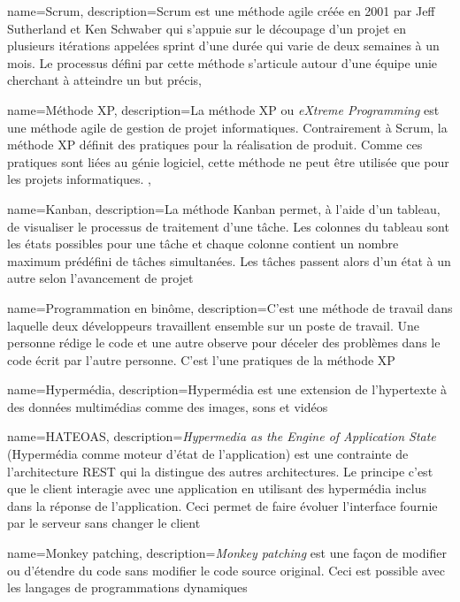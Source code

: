 \documentclass[a4paper,12pt,dvipsnames]{report}
\begin{document}
{
	name={Scrum},
	description={Scrum est une méthode agile créée en 2001 par Jeff Sutherland et Ken Schwaber qui s'appuie sur le découpage d'un projet en plusieurs itérations appelées sprint d'une durée qui varie de deux semaines à un mois. Le processus défini par cette méthode s'articule autour d'une équipe unie cherchant à atteindre un but précis},
}

{
	name={M\'ethode XP},
	description={La méthode XP ou \textit{eXtreme Programming} est une méthode agile de gestion de projet informatiques. Contrairement à Scrum, la méthode XP définit des pratiques pour la réalisation de produit. Comme ces pratiques sont liées au génie logiciel, cette méthode ne peut être utilisée que pour les projets informatiques. },
}

{
	name={Kanban},
	description={La méthode Kanban permet, à l'aide d'un tableau, de visualiser le processus de traitement d'une tâche. Les colonnes du tableau sont les états possibles pour une tâche et chaque colonne contient un nombre maximum prédéfini de tâches simultanées. Les tâches passent alors d'un état à un autre selon l'avancement de projet}
}

{
	name={Programmation en binôme},
	description={C'est une méthode de travail dans laquelle deux développeurs travaillent ensemble sur un poste de travail. Une personne rédige le code et une autre observe pour déceler des problèmes dans le code écrit par l'autre personne. C'est l'une pratiques de la méthode XP}
}

{
	name={Hyperm\'edia},
	description={Hypermédia est une extension de l'hypertexte à des données multimédias comme des images, sons et vidéos}
}

{
	name={HATEOAS},
	description={\textit{Hypermedia as the Engine of Application State} (Hypermédia comme moteur d'état de l'application) est une contrainte de l'architecture REST qui la distingue des autres architectures. Le principe c'est que le client interagie avec une application en utilisant des hypermédia inclus dans la réponse de l'application. Ceci permet de faire évoluer l'interface fournie par le serveur sans changer le client}  
}

{
	name={Monkey patching},
	description={\textit{Monkey patching} est une façon de modifier ou d'étendre du code sans modifier le code source original. Ceci est possible avec les langages de programmations dynamiques}  
}
\end{document}

